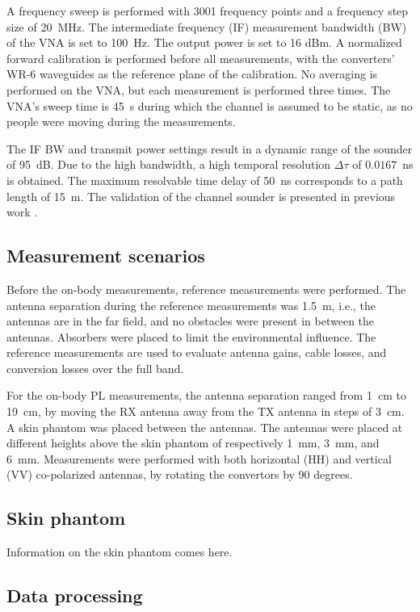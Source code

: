 \documentclass[preprint]{rsl}
\begin{document}
A frequency sweep is performed with 3001 frequency points and a frequency step size of 20~MHz. 
The intermediate frequency (IF) measurement bandwidth (BW) of the VNA is set to 100~Hz. 
The output power is set to 16 dBm.
A normalized forward calibration is performed before all measurements, with the converters' WR-6 waveguides as the reference plane of the calibration. 
No averaging is performed on the VNA, but each measurement is performed three times.
The VNA's sweep time is 45~s during which the channel is assumed to be static, as no people were moving during the measurements. 

The IF BW and transmit power settings result in a dynamic range of the sounder of 95~dB.
Due to the high bandwidth, a high temporal resolution $\Delta\tau$ of $0.0167$~ns is obtained.
The maximum resolvable time delay of 50~ns corresponds to a path length of 15~m.
The validation of the channel sounder is presented in previous work \cite{DeBeelde2021_eucap}. 

\subsection{Measurement scenarios}

Before the on-body measurements, reference measurements were performed. 
The antenna separation during the reference measurements was 1.5~m, i.e., the antennas are in the far field, and no obstacles were present in between the antennas. 
Absorbers were placed to limit the environmental influence.
The reference measurements are used to evaluate antenna gains, cable losses, and conversion losses over the full band. 

For the on-body PL measurements, the antenna separation ranged from 1~cm to 19~cm, by moving the RX antenna away from the TX antenna in steps of 3~cm.
A skin phantom was placed between the antennas. 
The antennas were placed at different heights above the skin phantom of respectively 1~mm, 3~mm, and 6~mm. 
Measurements were performed with both horizontal (HH) and vertical (VV) co-polarized antennas, by rotating the convertors by 90 degrees.

\subsection{Skin phantom}

Information on the skin phantom comes here.
\vspace{50pt}

\subsection{Data processing}
\end{document}
